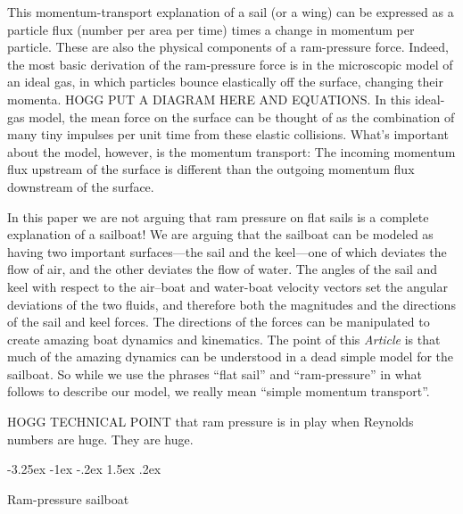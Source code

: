 \documentclass[letterpaper]{article}
\makeatletter
\newcommand{\documentname}{\textsl{Article}}
\renewcommand\section{\@startsection {section}{1}{\z@}%
  {-3.25ex \@plus -1ex \@minus -.2ex}%
  {1.5ex \@plus .2ex}%
  {\raggedright\normalfont\large\bfseries}}
\makeatother
\begin{document}
This momentum-transport explanation of a sail (or a wing) 
can be expressed as a particle flux (number per area per time) times a change in momentum per particle.
These are also the physical components of a ram-pressure force.
Indeed, the most basic derivation of the ram-pressure force is in the microscopic model of an ideal gas, in which particles bounce elastically off the surface, changing their momenta.
HOGG PUT A DIAGRAM HERE AND EQUATIONS.
In this ideal-gas model, the mean force on the surface can be thought of as the combination of many tiny impulses per unit time from these elastic collisions.
What's important about the model, however, is the momentum transport:
The incoming momentum flux upstream of the surface is different than the outgoing momentum flux downstream of the surface.

In this paper we are not arguing that ram pressure on flat sails is a complete explanation of a sailboat!
We are arguing that the sailboat can be modeled as having two important surfaces---the sail and the keel---one of which deviates the flow of air, and the other deviates the flow of water.
The angles of the sail and keel with respect to the air--boat and water-boat velocity vectors set the angular deviations of the two fluids, and therefore both the magnitudes and the directions of the sail and keel forces.
The directions of the forces can be manipulated to create amazing boat dynamics and kinematics.
The point of this \documentname{} is that much of the amazing dynamics can be understood in a dead simple model for the sailboat.
So while we use the phrases ``flat sail'' and ``ram-pressure'' in what follows to describe our model, we really mean ``simple momentum transport''.

HOGG TECHNICAL POINT that ram pressure is in play when Reynolds numbers are huge. They are huge.

\section{Ram-pressure sailboat}\label{sec:model}
\end{document}
